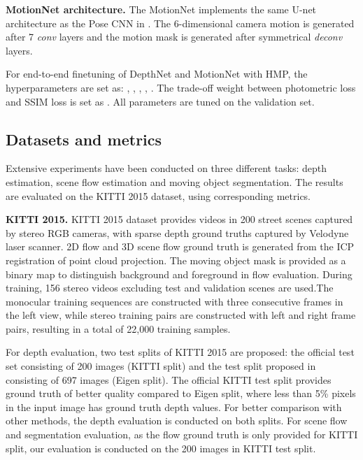 \documentclass[runningheads]{llncs}
\begin{document}
\vspace{0.5\baselineskip}
\noindent\textbf{MotionNet architecture.}
The MotionNet implements the same U-net \cite{ronneberger2015u} architecture as the Pose CNN in \cite{zhou2017unsupervised}. The 6-dimensional camera motion is generated after 7 \textit{conv} layers and the motion mask is generated after symmetrical \textit{deconv} layers.

For end-to-end finetuning of DepthNet and MotionNet with HMP, the hyperparameters are set as: , , , , . The trade-off weight between photometric loss and SSIM loss is set as . All parameters are tuned on the validation set.


\vspace{-0.3\baselineskip}
\subsection{Datasets and metrics}
\vspace{-0.3\baselineskip}

Extensive experiments have been conducted on three different tasks: depth estimation, scene flow estimation and moving object segmentation. The results are evaluated on the KITTI 2015 dataset, using corresponding metrics.

\vspace{0.5\baselineskip}
\noindent\textbf{KITTI 2015.}
KITTI 2015 dataset provides videos in 200 street scenes captured by stereo RGB cameras, with sparse depth ground truths captured by Velodyne laser scanner. 2D flow and 3D scene flow ground truth is generated from the ICP registration of point cloud projection. The moving object mask is provided as a binary map to distinguish background and foreground in flow evaluation. During training, 156 stereo videos excluding test and validation scenes are used.The monocular training sequences are constructed with three consecutive frames in the left view, while stereo training pairs are constructed with left and right frame pairs, resulting in a total of 22,000 training samples. 

For depth evaluation, two test splits of KITTI 2015 are proposed: the official test set consisting of 200 images (KITTI split) and the test split proposed in \cite{eigen2014depth} consisting of 697 images (Eigen split). The official KITTI test split provides ground truth of better quality compared to Eigen split, where less than 5\% pixels in the input image has ground truth depth values. For better comparison with other methods, the depth evaluation is conducted on both splits. For scene flow and segmentation evaluation, as the flow ground truth is only provided for KITTI split, our evaluation is conducted on the 200 images in KITTI test split.
\end{document}
